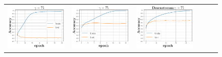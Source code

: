 \begin{figure}[h]
\begin{minipage}{0.99\columnwidth}
{\begin{tabular}{cccccc}
\includegraphics[scale=0.125]{figs/galu_75_bad.pdf}&
\includegraphics[scale=0.125]{figs/galu_75_bad_good.pdf}&
\includegraphics[scale=0.125]{figs/relu_75_good.pdf}&

\end{tabular}}
\end{minipage}
\end{figure}
